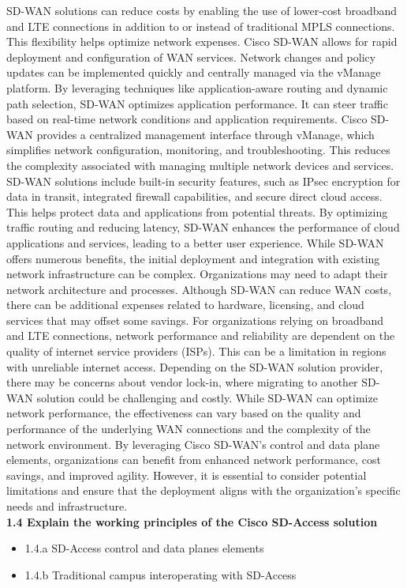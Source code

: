 \documentclass{article}
\begin{document}
	SD-WAN solutions can reduce costs by enabling the use of lower-cost broadband and LTE connections in addition to or instead of traditional MPLS connections. This flexibility helps optimize network expenses. Cisco SD-WAN allows for rapid deployment and configuration of WAN services. Network changes and policy updates can be implemented quickly and centrally managed via the vManage platform. By leveraging techniques like application-aware routing and dynamic path selection, SD-WAN optimizes application performance. It can steer traffic based on real-time network conditions and application requirements. Cisco SD-WAN provides a centralized management interface through vManage, which simplifies network configuration, monitoring, and troubleshooting. This reduces the complexity associated with managing multiple network devices and services. SD-WAN solutions include built-in security features, such as IPsec encryption for data in transit, integrated firewall capabilities, and secure direct cloud access. This helps protect data and applications from potential threats. By optimizing traffic routing and reducing latency, SD-WAN enhances the performance of cloud applications and services, leading to a better user experience. While SD-WAN offers numerous benefits, the initial deployment and integration with existing network infrastructure can be complex. Organizations may need to adapt their network architecture and processes. Although SD-WAN can reduce WAN costs, there can be additional expenses related to hardware, licensing, and cloud services that may offset some savings. For organizations relying on broadband and LTE connections, network performance and reliability are dependent on the quality of internet service providers (ISPs). This can be a limitation in regions with unreliable internet access. Depending on the SD-WAN solution provider, there may be concerns about vendor lock-in, where migrating to another SD-WAN solution could be challenging and costly. While SD-WAN can optimize network performance, the effectiveness can vary based on the quality and performance of the underlying WAN connections and the complexity of the network environment. By leveraging Cisco SD-WAN’s control and data plane elements, organizations can benefit from enhanced network performance, cost savings, and improved agility. However, it is essential to consider potential limitations and ensure that the deployment aligns with the organization's specific needs and infrastructure.\\

\textbf{1.4 Explain the working principles of the Cisco SD-Access solution}
\begin{itemize}
\item 1.4.a SD-Access control and data planes elements
\item 1.4.b Traditional campus interoperating with SD-Access
\end{itemize}
\end{document}
